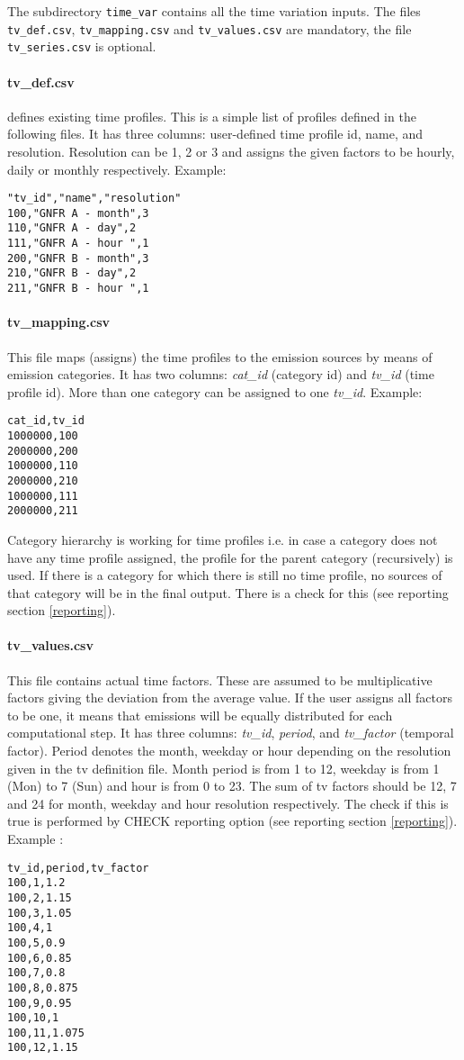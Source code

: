 \documentclass[a4paper,11pt]{article}
\begin{document}
The subdirectory \verb|time_var| contains all the time variation inputs. The files \verb|tv_def.csv|, \verb|tv_mapping.csv| and \verb|tv_values.csv| are mandatory, the file \verb|tv_series.csv| is optional.

\paragraph{tv\_def.csv} defines existing time profiles. This is a simple list of profiles defined in the following files. It has three columns: user-defined time profile id, name, and resolution. Resolution can be 1, 2 or 3 and assigns the given factors to be hourly, daily or monthly respectively. Example:
\begin{verbatim} 
"tv_id","name","resolution"
100,"GNFR A - month",3
110,"GNFR A - day",2
111,"GNFR A - hour ",1
200,"GNFR B - month",3
210,"GNFR B - day",2
211,"GNFR B - hour ",1
\end{verbatim}

\paragraph{tv\_mapping.csv} This file maps (assigns) the time profiles to the emission sources by means of emission categories. It has two columns: {\em cat\_id} (category id) and {\em tv\_id} (time profile id). More than one category can be assigned to one {\em tv\_id}. Example:
\begin{verbatim} 
cat_id,tv_id
1000000,100
2000000,200
1000000,110
2000000,210
1000000,111
2000000,211
\end{verbatim}
Category hierarchy is working for time profiles i.e. in case a category does not have any time profile assigned, the profile for the parent category (recursively) is used. If there is a category for which there is still no time profile, no sources of that category will be in the final output. There is a check for this (see reporting section \ref{reporting}). 

\paragraph{tv\_values.csv} This file contains actual time factors. These are assumed to be multiplicative factors giving the deviation from the average value. If the user assigns all factors to be one, it means that emissions will be equally distributed for each computational step. It has three columns: {\em tv\_id}, {\em period}, and {\em tv\_factor} (temporal factor). Period denotes the month, weekday or hour depending on the resolution given in the tv definition file. Month period is from 1 to 12, weekday is from 1 (Mon) to 7 (Sun) and hour is from 0 to 23. The sum of tv factors should be 12, 7 and 24 for month, weekday and hour resolution respectively. The check if this is true is performed by CHECK reporting option (see reporting section \ref{reporting}). Example :
\begin{verbatim} 
tv_id,period,tv_factor
100,1,1.2
100,2,1.15
100,3,1.05
100,4,1
100,5,0.9
100,6,0.85
100,7,0.8
100,8,0.875
100,9,0.95
100,10,1
100,11,1.075
100,12,1.15
\end{verbatim}
\end{document}
